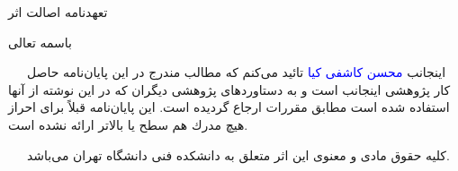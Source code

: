 \thispagestyle{empty}
\begin{minipage}
{0.92\textwidth}
\baselineskip=1.0cm
\begin{center}
تعهدنامه اصالت اثر

باسمه تعالی 
\end{center}

~~~اينجانب
\textcolor{blue}{محسن کاشفی کیا}
تائيد می‌كنم كه مطالب مندرج در اين پایان‌نامه حاصل كار پژوهشی اينجانب است و به دستاوردهای پژوهشی ديگران كه در اين نوشته از آنها استفاده شده است مطابق مقررات ارجاع گرديده است. اين پایان‌نامه قبلاً برای احراز هيچ مدرك هم سطح يا بالاتر ارائه نشده است.

~~~كليه حقوق مادی و معنوی اين اثر متعلق به دانشكده فنی دانشگاه تهران می‌باشد.
\vspace{1.cm}
\begin{center}

\vspace{1.cm}
\end{center}

\end{minipage}
\clearpage
~~~
\thispagestyle{empty}
\clearpage


